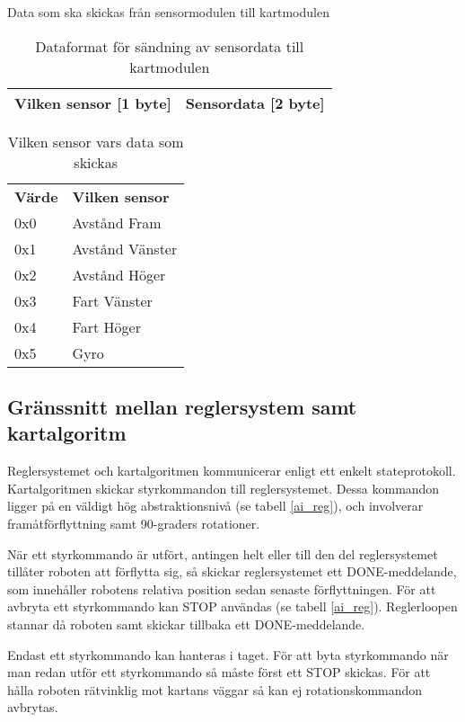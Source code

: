 Data som ska skickas från sensormodulen till kartmodulen
\begin{table}[H]
	\caption{Dataformat för sändning av sensordata till kartmodulen}
	\begin{center}
	\begin{tabular}{| c | c |} \hline
		Vilken sensor [1 byte] &
		Sensordata [2 byte] \\ \hline
	\end{tabular}
	\end{center}
\end{table}

\begin{table}[H]
	\caption{Vilken sensor vars data som skickas}
	\begin{tabular}{l l}
		\textbf{Värde} & \textbf{Vilken sensor} \\
		0x0	&	Avstånd Fram \\
		0x1	&	Avstånd Vänster \\
		0x2	&	Avstånd Höger \\
		0x3	&	Fart Vänster \\
		0x4	&	Fart Höger \\
		0x5	&	Gyro \\
	\end{tabular}
\end{table}

\subsection{Gränssnitt mellan reglersystem samt kartalgoritm}
Reglersystemet och kartalgoritmen kommunicerar enligt ett enkelt
stateprotokoll. Kartalgoritmen skickar styrkommandon till reglersystemet. Dessa
kommandon ligger på en väldigt hög abstraktionsnivå (se tabell \ref{ai_reg}),
och involverar framåtförflyttning samt 90-graders rotationer.

När ett styrkommando är utfört, antingen helt eller till den del reglersystemet
tillåter roboten att förflytta sig, så skickar reglersystemet ett
DONE-meddelande, som innehåller robotens relativa position sedan senaste
förflyttningen. För att avbryta ett styrkommando kan STOP användas (se tabell
\ref{ai_reg}). Reglerloopen stannar då roboten samt skickar tillbaka ett
DONE-meddelande.

Endast ett styrkommando kan hanteras i taget. För att byta styrkommando när
man redan utför ett styrkommando så måste först ett STOP skickas. För att 
hålla roboten rätvinklig mot kartans väggar så kan ej rotationskommandon
avbrytas.

